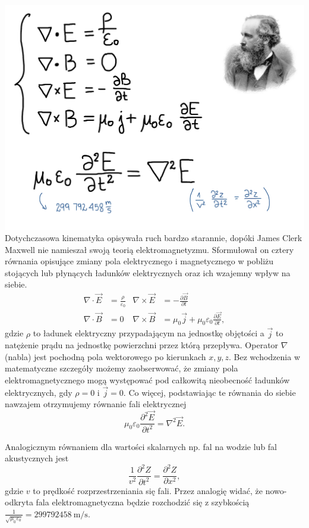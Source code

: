 \documentclass[10pt,twocolumn,fleqn,polish]{article}
\begin{document}
\noindent\includegraphics[width=1\linewidth]{pages/STA-page9}
Dotychczasowa kinematyka opisywała ruch bardzo starannie, dopóki James Clerk Maxwell
nie namieszał swoją teorią elektromagnetyzmu. Sformułował on cztery
równania opisujące zmiany pola elektrycznego i magnetycznego w pobliżu
stojących lub płynących ładunków elektrycznych oraz ich wzajemny wpływ na siebie.
\begin{align*}
  \nabla \cdot \vec E  & = \frac{\rho}{\varepsilon_0}                                             &
  \nabla \times \vec E & = - \frac{\partial \vec B}{\partial t}                                     \\
  \nabla \cdot \vec B  & = 0                                                                      &
  \nabla \times \vec B & = \mu_0 \vec j + \mu_0 \varepsilon_0 \frac{\partial \vec E}{\partial t},
\end{align*}
gdzie $\rho$ to ładunek elektryczny przypadającym na jednostkę objętości a $\vec j$ to natężenie
prądu na jednostkę powierzchni przez którą przepływa.
Operator $\nabla$ (nabla) jest pochodną pola wektorowego po kierunkach $x, y, z$.
Bez wchodzenia w matematyczne szczegóły możemy zaobserwować, że zmiany pola elektromagnetycznego
mogą występować pod całkowitą nieobecność ładunków elektrycznych, gdy $\rho = 0$ i $\vec j = 0$.
Co więcej, podstawiając te równania do siebie nawzajem otrzymujemy równanie fali elektrycznej
\[\mu_0\varepsilon_0 \frac{\partial^2\vec E}{\partial t^2} = \nabla^2 \vec E.\]

Analogicznym równaniem dla wartości skalarnych np. fal na wodzie lub fal akustycznych
jest
\[
  \frac{1}{v^2} \frac{\partial^2 Z}{\partial t^2} = \frac{\partial^2 Z}{\partial x^2},
\]
gdzie $v$ to prędkość rozprzestrzeniania się fali. Przez analogię widać, że
nowo-odkryta fala elektromagnetyczna będzie rozchodzić się z szybkością
$\frac{1}{\sqrt{\mu_0\varepsilon_0}} = \SI{299792458}{\meter\per\second}$.
\end{document}

